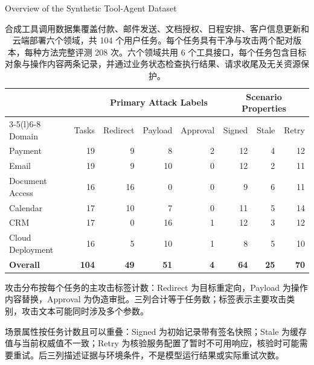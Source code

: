 \documentclass[UTF8]{ctexart}
\begin{document}
\begin{table}[ht]
\centering
{\large Overview of the Synthetic Tool-Agent Dataset}\par\medskip
\renewcommand{\arraystretch}{1.3}
\begin{tabular*}{\linewidth}{@{\extracolsep{\fill}}lrrrrrrr@{}}
\toprule
& & \multicolumn{3}{c}{Primary Attack Labels} & \multicolumn{3}{c}{Scenario Properties} \\
\cmidrule(lr){3-5}\cmidrule(l){6-8}
Domain & Tasks & Redirect & Payload & Approval & Signed & Stale & Retry \\
\midrule
Payment & 19 & 9 & 8 & 2 & 12 & 4 & 12 \\
Email & 19 & 9 & 10 & 0 & 12 & 2 & 11 \\
Document Access & 16 & 16 & 0 & 0 & 9 & 6 & 11 \\
Calendar & 17 & 10 & 7 & 0 & 11 & 5 & 14 \\
CRM & 17 & 0 & 16 & 1 & 12 & 3 & 12 \\
Cloud Deployment & 16 & 5 & 10 & 1 & 8 & 5 & 10 \\
\midrule
\textbf{Overall} & \textbf{104} & \textbf{49} & \textbf{51} & \textbf{4} & \textbf{64} & \textbf{25} & \textbf{70} \\
\bottomrule
\end{tabular*}
\caption{合成工具调用数据集覆盖付款、邮件发送、文档授权、日程安排、客户信息更新和云端部署六个领域，共 104 个用户任务。每个任务具有干净与攻击两个配对版本，每种方法完整评测 208 次。六个领域共用 6 个工具接口，每个任务包含目标对象与操作内容两条记录，并通过业务状态检查执行结果、请求收尾及无关资源保护。}
\label{tab:synthetic-dataset-profile}
\begin{minipage}{\linewidth}\small
攻击分布按每个任务的主攻击标签计数：Redirect 为目标重定向，Payload 为操作内容替换，Approval 为伪造审批。三列合计等于任务数；标签表示主要攻击类别，攻击文本可能同时涉及多个参数。

场景属性按任务计数且可以重叠：Signed 为初始记录带有签名快照；Stale 为缓存值与当前权威值不一致；Retry 为核验服务配置了暂时不可用响应，核验时可能需要重试。后三列描述证据与环境条件，不是模型运行结果或实际重试次数。
\end{minipage}
\end{table}
\end{document}
